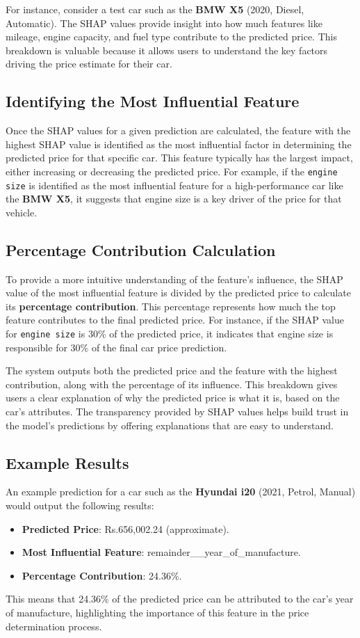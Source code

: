 \documentclass[a4paper,12pt]{article}
\begin{document}
\begin{justify}
For instance, consider a test car such as the \textbf{BMW X5} (2020, Diesel, Automatic). The SHAP values provide insight into how much features like mileage, engine capacity, and fuel type contribute to the predicted price. This breakdown is valuable because it allows users to understand the key factors driving the price estimate for their car.

\subsection{Identifying the Most Influential Feature}
Once the SHAP values for a given prediction are calculated, the feature with the highest SHAP value is identified as the most influential factor in determining the predicted price for that specific car. This feature typically has the largest impact, either increasing or decreasing the predicted price. For example, if the \texttt{engine size} is identified as the most influential feature for a high-performance car like the \textbf{BMW X5}, it suggests that engine size is a key driver of the price for that vehicle.

\subsection{Percentage Contribution Calculation}
To provide a more intuitive understanding of the feature’s influence, the SHAP value of the most influential feature is divided by the predicted price to calculate its \textbf{percentage contribution}. This percentage represents how much the top feature contributes to the final predicted price. For instance, if the SHAP value for \texttt{engine size} is 30\% of the predicted price, it indicates that engine size is responsible for 30\% of the final car price prediction.
\newline

The system outputs both the predicted price and the feature with the highest contribution, along with the percentage of its influence. This breakdown gives users a clear explanation of why the predicted price is what it is, based on the car’s attributes. The transparency provided by SHAP values helps build trust in the model's predictions by offering explanations that are easy to understand.

\subsection{Example Results}
An example prediction for a car such as the \textbf{Hyundai i20} (2021, Petrol, Manual) would output the following results:
\begin{itemize}
    \item \textbf{Predicted Price}: Rs.656,002.24 (approximate).
    \item \textbf{Most Influential Feature}: remainder\_\_year\_of\_manufacture.
    \item \textbf{Percentage Contribution}: 24.36\%.
\end{itemize}
This means that 24.36\% of the predicted price can be attributed to the car's year of manufacture, highlighting the importance of this feature in the price determination process.


\end{justify}
\end{document}
